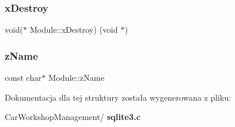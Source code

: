\subsubsection{xDestroy}
{\footnotesize\ttfamily void($\ast$ Module\+::x\+Destroy) (void $\ast$)}

\mbox{\label{struct_module_a45a5f5b43926b8ebf3e13e46a6534810}} 
\subsubsection{zName}
{\footnotesize\ttfamily const char$\ast$ Module\+::z\+Name}



Dokumentacja dla tej struktury została wygenerowana z pliku\+:\begin{DoxyCompactItemize}
\item 
Car\+Workshop\+Management/\textbf{ sqlite3.\+c}\end{DoxyCompactItemize}
